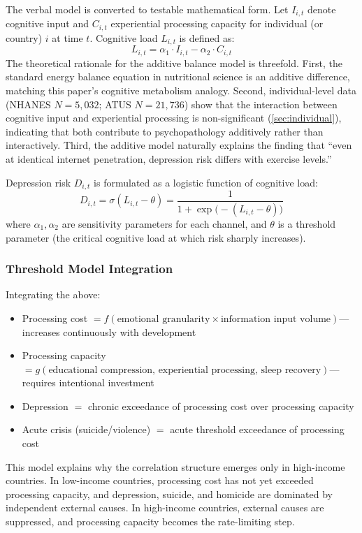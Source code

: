 \documentclass[a4paper,11pt,titlepage]{article}
\newcommand{\balanceL}{L}
\newcommand{\cogInput}{I}
\newcommand{\expProc}{C}
\begin{document}
The verbal model is converted to testable mathematical form. Let $\cogInput_{i,t}$ denote cognitive input and $\expProc_{i,t}$ experiential processing capacity for individual (or country) $i$ at time $t$. Cognitive load $\balanceL_{i,t}$ is defined as:
\begin{equation}\label{eq:balance}
  \balanceL_{i,t} = \alpha_1 \cdot \cogInput_{i,t} - \alpha_2 \cdot \expProc_{i,t}
\end{equation}
The theoretical rationale for the additive balance model is threefold. First, the standard energy balance equation in nutritional science is an additive difference, matching this paper's cognitive metabolism analogy. Second, individual-level data (NHANES $N=5{,}032$; ATUS $N=21{,}736$) show that the interaction between cognitive input and experiential processing is non-significant (\cref{sec:individual}), indicating that both contribute to psychopathology additively rather than interactively. Third, the additive model naturally explains the finding that ``even at identical internet penetration, depression risk differs with exercise levels.''

Depression risk $D_{i,t}$ is formulated as a logistic function of cognitive load:
\begin{equation}\label{eq:logistic}
  D_{i,t} = \sigma(\balanceL_{i,t} - \theta)
  = \frac{1}{1 + \exp\bigl(-(\balanceL_{i,t} - \theta)\bigr)}
\end{equation}
where $\alpha_1, \alpha_2$ are sensitivity parameters for each channel, and $\theta$ is a threshold parameter (the critical cognitive load at which risk sharply increases).

\subsubsection{Threshold Model Integration}

Integrating the above:
\begin{itemize}
  \item Processing cost $= f(\text{emotional granularity} \times \text{information input volume})$---increases continuously with development
  \item Processing capacity $= g(\text{educational compression, experiential processing, sleep recovery})$---requires intentional investment
  \item Depression $=$ chronic exceedance of processing cost over processing capacity
  \item Acute crisis (suicide/violence) $=$ acute threshold exceedance of processing cost
\end{itemize}
This model explains why the correlation structure emerges only in high-income countries. In low-income countries, processing cost has not yet exceeded processing capacity, and depression, suicide, and homicide are dominated by independent external causes. In high-income countries, external causes are suppressed, and processing capacity becomes the rate-limiting step.
\end{document}
